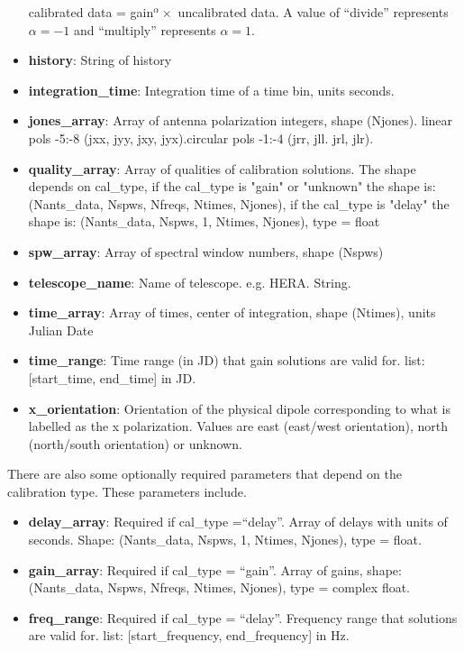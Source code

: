 \documentclass[11pt, oneside]{article}   	%
\begin{document}
\begin{itemize}
{    calibrated data = gain$^{\alpha} \times $ uncalibrated data. A value of
    ``divide'' represents $\alpha=-1$ and ``multiply'' represents $\alpha=1$.}
\item{\textbf{history}: String of history}
\item{\textbf{integration\_time}: Integration time of a time bin, units seconds.}
\item{\textbf{jones\_array}: Array of antenna polarization integers, shape
    (Njones). linear pols -5:-8 (jxx, jyy, jxy, jyx).circular pols -1:-4 (jrr,
    jll. jrl, jlr).}
\item{\textbf{quality\_array}: Array of qualities of calibration solutions. The
    shape depends on cal\_type, if the cal\_type is "gain" or "unknown" the shape is:
    (Nants\_data, Nspws, Nfreqs, Ntimes, Njones), if the cal\_type is "delay" the shape is: 
    (Nants_data, Nspws, 1, Ntimes, Njones), type = float}
\item{\textbf{spw\_array}: Array of spectral window numbers, shape (Nspws)}
\item{\textbf{telescope\_name}: Name of telescope. e.g. HERA. String.}
\item{\textbf{time\_array}: Array of times, center of integration, shape
    (Ntimes), units Julian Date}
\item{\textbf{time\_range}: Time range (in JD) that gain solutions are valid
    for. list: [start\_time, end\_time] in JD.}
\item{\textbf{x\_orientation}: Orientation of the physical dipole corresponding
    to what is labelled as the x polarization. Values are east (east/west
    orientation), north (north/south orientation) or unknown.}
\end{itemize}

There are also some optionally required parameters that depend on the
calibration type. These parameters include.
\begin{itemize}
\item{\textbf{delay\_array}: Required if cal\_type =``delay''. Array of delays with
    units of seconds. Shape: (Nants_data, Nspws, 1, Ntimes, Njones), type = float.}
\item{\textbf{gain\_array}: Required if cal\_type = ``gain''. Array of gains, 
    shape: (Nants_data, Nspws, Nfreqs, Ntimes, Njones), type = complex float.}
\item{\textbf{freq\_range}: Required if cal\_type = ``delay''. Frequency range that
   solutions are valid for. list: [start_frequency, end_frequency] in Hz.}
\end{itemize}
\end{document}

